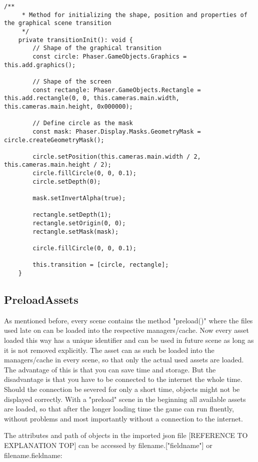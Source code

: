 \begin{lstlisting}[style=TypeScript, caption=BaseScene.ts]
    /**
     * Method for initializing the shape, position and properties of the graphical scene transition
     */
    private transitionInit(): void {
        // Shape of the graphical transition
        const circle: Phaser.GameObjects.Graphics = this.add.graphics();

        // Shape of the screen
        const rectangle: Phaser.GameObjects.Rectangle = this.add.rectangle(0, 0, this.cameras.main.width, this.cameras.main.height, 0x000000);

        // Define circle as the mask
        const mask: Phaser.Display.Masks.GeometryMask = circle.createGeometryMask();

        circle.setPosition(this.cameras.main.width / 2, this.cameras.main.height / 2);
        circle.fillCircle(0, 0, 0.1);
        circle.setDepth(0);

        mask.setInvertAlpha(true);

        rectangle.setDepth(1);
        rectangle.setOrigin(0, 0);
        rectangle.setMask(mask);

        circle.fillCircle(0, 0, 0.1);

        this.transition = [circle, rectangle];
    }
\end{lstlisting}

\subsection{PreloadAssets}\label{subsec:preloadassets}
As mentioned before, every scene contains the method "preload()"
where the files used late on can be loaded into the respective managers/cache.
Now every asset loaded this way has a unique identifier and can be used in future scene
as long as it is not removed explicitly.
The asset can as such be loaded into the managers/cache in every scene,
so that only the actual used assets are loaded.
The advantage of this is that you can save time and storage.
But the disadvantage is that you have to be connected to the internet the whole time.
Should the connection be severed for only a short time, objects might not be displayed correctly.
With a "preload" scene in the beginning all available assets are loaded,
so that after the longer loading time the game can run fluently,
without problems and most importantly without a connection to the internet.

The attributes and path of objects in the imported json file [REFERENCE TO EXPLANATION TOP]
can be accessed by filename.["fieldname"] or filename.fieldname:

